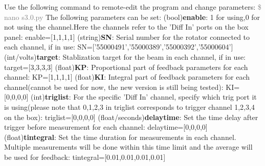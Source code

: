 \documentclass{article}
\begin{document}
Use the following command to remote-edit the program and change parameters:\newline
\textcolor{gray}{\$ nano s3.0.py}\newline
The following parameters can be set: \newline\newline
(bool)\textbf{enable}: 1 for using,0 for not using the channel.Here the channels refer to the 'Diff In' ports on the box panel:\newline
enable=[1,1,1,1]\newline\newline
(string)\textbf{SN}: Serial number for the rotator connected to each channel, if in use:\newline
SN=['55000491','55000389','55000392','55000604']\newline\newline
(int/volts)\textbf{target}: Stablization target for the beam in each channel, if in use:\newline
target=[3,3,3,3]\newline\newline
(float)\textbf{KP}: Proportional part of feedback parameters for each channel:\newline
KP=[1,1,1,1]\newline\newline
(float)\textbf{KI}: Integral part of feedback parameters  for each channel(cannot be used for now, the new version is still being tested):\newline
KI=[0,0,0,0]\newline\newline
(int)\textbf{triglist}: For the specific 'Diff In' channel, specify which trig port it is using(please note that 0,1,2,3 in triglist corresponds to trigger channel 1,2,3,4 on the box):\newline
triglist=[0,0,0,0]\newline\newline
(float/seconds)\textbf{delaytime}: Set the time delay after trigger before measurement for each channel:\newline
delaytime=[0,0,0,0]\newline\newline
(float)\textbf{tintegral}: Set the time duration for measurements  in each channel. Multiple measurements will be done within this time limit and the average will be used for feedback:\newline
tintegral=[0.01,0.01,0.01,0.01]\newline\newline
\end{document}
